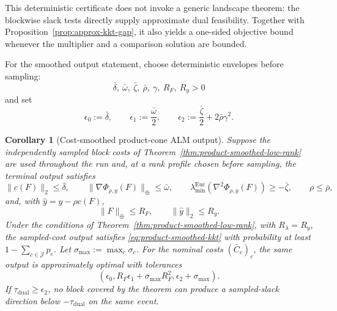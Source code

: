 \documentclass[11pt]{article}
\newtheorem{corollary}{Corollary}
\theoremstyle{definition}
\theoremstyle{remark}
\begin{document}
This deterministic certificate does not invoke a generic landscape theorem:
the blockwise slack tests directly supply approximate dual feasibility.
Together with Proposition~\ref{prop:approx-kkt-gap}, it also yields a
one-sided objective bound whenever the multiplier and a comparison solution
are bounded.

For the smoothed output statement, choose deterministic envelopes before
sampling:
\[
  \bar\delta,\ \bar\omega,\ \bar\zeta,\ \bar\rho,\
  \gamma,\ R_F,\ R_y>0
\]
and set
\begin{equation}
  \epsilon_0:=\bar\delta,
  \qquad
  \epsilon_1:=\frac{\bar\omega}{2},
  \qquad
  \epsilon_2:=\frac{\bar\zeta}{2}+2\bar\rho\gamma^2.
  \label{eq:fixed-smoothed-tolerances}
\end{equation}

\begin{corollary}[Cost-smoothed product-cone ALM output]
\label{cor:product-smoothed-output}
Suppose the independently sampled block costs of
Theorem~\ref{thm:product-smoothed-low-rank} are used throughout the run and,
at a rank profile chosen before sampling, the terminal output satisfies
\begin{equation}
  \|c(F)\|_2\leq\bar\delta,
  \qquad
  \|\nabla\Phi_{\rho,y}(F)\|_\oplus\leq\bar\omega,
  \qquad
  \lambda_{\min}^{\mathrm{Euc}}
    \!\left(\nabla^2\Phi_{\rho,y}(F)\right)\geq-\bar\zeta,
  \qquad
  \rho\leq\bar\rho,
  \label{eq:smoothed-output-residuals}
\end{equation}
and, with $\widehat y=y-\rho c(F)$,
\begin{equation}
  \|F\|_\oplus\leq R_F,
  \qquad
  \|\widehat y\|_2\leq R_y.
  \label{eq:smoothed-output-bounds}
\end{equation}
Under the conditions of
Theorem~\ref{thm:product-smoothed-low-rank}, with $R_\lambda=R_y$, the
sampled-cost output satisfies \eqref{eq:product-smoothed-kkt} with probability
at least $1-\sum_{c\in\mathcal J}p_c$.  Let
$\sigma_{\max}:=\max_c\sigma_c$.  For the nominal costs $(\bar C_c)_c$, the
same output is approximately optimal with tolerances
\begin{equation}
  \left(
    \epsilon_0,
    R_F\epsilon_1+\sigma_{\max}R_F^2,
    \epsilon_2+\sigma_{\max}
  \right).
  \label{eq:product-nominal-kkt}
\end{equation}
If $\tau_{\mathrm{dual}}\geq\epsilon_2$, no block covered by the theorem can
produce a sampled-slack direction below $-\tau_{\mathrm{dual}}$ on the same
event.
\end{corollary}
\end{document}

